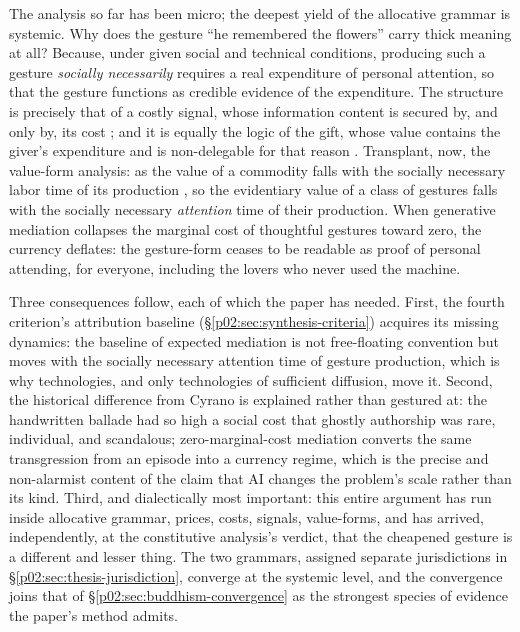 \documentclass[11pt,a4paper]{article}
\begin{document}
The analysis so far has been micro; the deepest yield of the allocative grammar is systemic. Why does the gesture ``he remembered the flowers'' carry thick meaning at all? Because, under given social and technical conditions, producing such a gesture \emph{socially necessarily} requires a real expenditure of personal attention, so that the gesture functions as credible evidence of the expenditure. The structure is precisely that of a costly signal, whose information content is secured by, and only by, its cost \parencite{spence1973job}; and it is equally the logic of the gift, whose value contains the giver's expenditure and is non-delegable for that reason \parencite{mauss1925gift}. Transplant, now, the value-form analysis: as the value of a commodity falls with the socially necessary labor time of its production \parencite{marx1867capital}, so the evidentiary value of a class of gestures falls with the socially necessary \emph{attention} time of their production. When generative mediation collapses the marginal cost of thoughtful gestures toward zero, the currency deflates: the gesture-form ceases to be readable as proof of personal attending, for everyone, including the lovers who never used the machine.

Three consequences follow, each of which the paper has needed. First, the fourth criterion's attribution baseline (\S\ref{p02:sec:synthesis-criteria}) acquires its missing dynamics: the baseline of expected mediation is not free-floating convention but moves with the socially necessary attention time of gesture production, which is why technologies, and only technologies of sufficient diffusion, move it. Second, the historical difference from Cyrano is explained rather than gestured at: the handwritten ballade had so high a social cost that ghostly authorship was rare, individual, and scandalous; zero-marginal-cost mediation converts the same transgression from an episode into a currency regime, which is the precise and non-alarmist content of the claim that AI changes the problem's scale rather than its kind. Third, and dialectically most important: this entire argument has run inside allocative grammar, prices, costs, signals, value-forms, and has arrived, independently, at the constitutive analysis's verdict, that the cheapened gesture is a different and lesser thing. The two grammars, assigned separate jurisdictions in \S\ref{p02:sec:thesis-jurisdiction}, converge at the systemic level, and the convergence joins that of \S\ref{p02:sec:buddhism-convergence} as the strongest species of evidence the paper's method admits.
\end{document}
